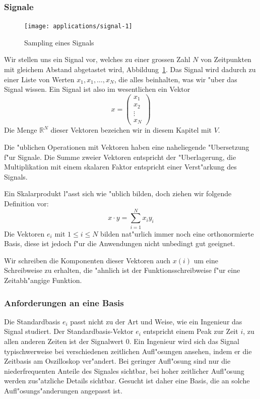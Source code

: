 \subsubsection{Signale}
\begin{figure}
\begin{center}
\texttt{[image: applications/signal-1]}
\end{center}
\caption{Sampling eines Signals\label{signal:vector}}
\end{figure}
Wir stellen uns ein Signal vor, welches zu einer grossen Zahl $N$
von Zeitpunkten mit gleichem Abstand abgetastet wird,
Abbildung~\ref{signal:vector}. Das Signal
wird dadurch zu einer Liste von Werten $x_1,x_1,\dots,x_N$, die
alles beinhalten, was wir "uber das Signal wissen. Ein Signal
ist also im wesentlichen ein Vektor
$$
x=\begin{pmatrix}x_1\\x_2\\\vdots\\x_N\end{pmatrix}
$$
Die Menge $\mathbb R^N$ dieser Vektoren bezeichen wir in diesem
Kapitel mit $V$. 

Die "ublichen Operationen mit Vektoren haben eine naheliegende
"Ubersetzung f"ur Signale. Die Summe zweier Vektoren entspricht
der "Uberlagerung, die Multiplikation mit einem skalaren Faktor
entspricht einer Verst"arkung des Signals. 

Ein Skalarprodukt l"asst sich wie "ublich bilden, doch ziehen
wir folgende Definition vor:
$$
x\cdot y=\sum_{i=1}^Nx_iy_i
$$
Die Vektoren $e_i$ mit $1\le i\le N$ bilden nat"urlich immer noch
eine orthonormierte Basis, diese ist jedoch f"ur die Anwendungen
nicht unbedingt gut geeignet.

Wir schreiben die Komponenten dieser Vektoren auch $x(i)$ um
eine Schreibweise zu erhalten, die "ahnlich ist der Funktionsschreibweise
f"ur eine Zeitabh"angige Funktion.

\subsubsection{Anforderungen an eine Basis}
Die Standardbasis $e_i$ passt nicht zu der Art und Weise, wie ein
Ingenieur das Signal studiert. Der Standardbasis-Vektor $e_i$
entspricht einem Peak zur Zeit $i$, zu allen anderen Zeiten
ist der Signalwert $0$.
Ein Ingenieur wird sich das Signal
typischwerweise bei verschiedenen zeitlichen Aufl"osungen
ansehen, indem er die Zeitbasis am Oszilloskop ver"andert.
Bei geringer Aufl"osung sind nur die niederfrequenten
Anteile des Signales sichtbar, bei hoher zeitlicher Aufl"osung
werden zus"atzliche Details sichtbar.
Gesucht ist daher eine Basis, die an solche Aufl"osungs"anderungen
angepasst ist.


